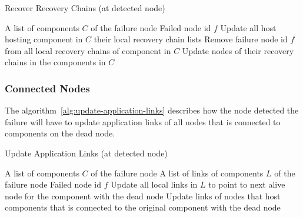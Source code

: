 \begin{algorithm}
\caption{Recover Recovery Chains (at detected node)}
\label{alg:recover-recovery-chains}
\begin{algorithmic}
\Require A list of components $C$ of the failure node
\Require Failed node id $f$
\Ensure Update all host hosting component in $C$ their local recovery chain
lists
\State Remove failure node id $f$ from all local recovery chains of component in $C$
\State Update nodes of their recovery chains in the components in $C$
\end{algorithmic}
\end{algorithm}

\subsubsection{Connected Nodes}

The algorithm~\ref{alg:update-application-links} describes how the node detected
the failure will have to update application links of all nodes that is
connected to components on the dead node.

\begin{algorithm}
\caption{Update Application Links (at detected node)}
\label{alg:update-application-links}
\begin{algorithmic}
\Require A list of components $C$ of the failure node
\Require A list of links of components $L$ of the failure node
\Require Failed node id $f$
\Ensure Update all local links in $L$ to point to next alive node for the component
with the dead node
\State Update links of nodes that host components that is connected to the
original component with the dead node
\end{algorithmic}
\end{algorithm}

